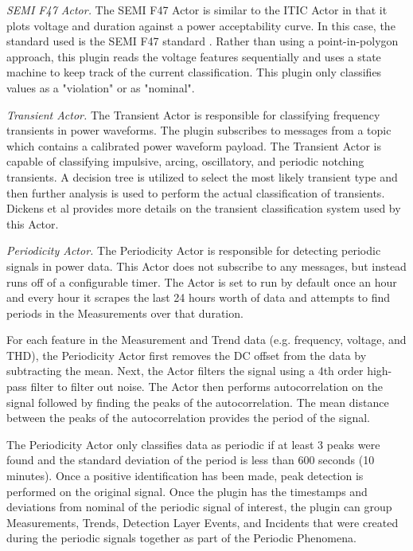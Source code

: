 {\em SEMI F47 Actor.} The SEMI F47 Actor is similar to the ITIC Actor in that it plots voltage and duration against a power acceptability curve. In this case, the standard used is the SEMI F47 standard \cite{djokic_sensitivity_2005}. Rather than using a point-in-polygon approach, this plugin reads the voltage features sequentially and uses a state machine to keep track of the current classification. This plugin only classifies values as a "violation" or as "nominal".

{\em Transient Actor.} The Transient Actor is responsible for classifying frequency transients in power waveforms. The plugin subscribes to messages from a topic which contains a calibrated power waveform payload. The Transient Actor is capable of classifying impulsive, arcing, oscillatory, and periodic notching transients. A decision tree is utilized to select the most likely transient type and then further analysis is used to perform the actual classification of transients. Dickens et al \cite{dickens_transient_2019} provides more details on the transient classification system used by this Actor.

{\em Periodicity Actor.} The Periodicity Actor is responsible for detecting periodic signals in power data. This Actor does not subscribe to any messages, but instead runs off of a configurable timer. The Actor is set to run by default once an hour and every hour it scrapes the last 24 hours worth of data and attempts to find periods in the Measurements over that duration.

For each feature in the Measurement and Trend data (e.g. frequency, voltage, and THD), the Periodicity Actor first removes the DC offset from the data by subtracting the mean. Next, the Actor filters the signal using a 4th order high-pass filter to filter out noise. The Actor then performs autocorrelation on the signal followed by finding the peaks of the autocorrelation. The mean distance between the peaks of the autocorrelation provides the period of the signal.

The Periodicity Actor only classifies data as periodic if at least 3 peaks were found and the standard deviation of the period is less than 600 seconds (10 minutes). Once a positive identification has been made, peak detection is performed on the original signal. Once the plugin has the timestamps and deviations from nominal of the periodic signal of interest, the plugin can group Measurements, Trends, Detection Layer Events, and Incidents that were created during the periodic signals together as part of the Periodic Phenomena.

